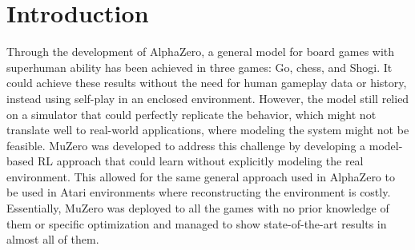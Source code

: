 \documentclass{article}
\begin{document}
\section*{Introduction}
Through the development of AlphaZero, a general model for board games with superhuman ability has 
been achieved in three games: Go, chess, and Shogi. It could achieve these results without the need for 
human gameplay data or history, instead using self-play in an enclosed environment. However, the 
model still relied on a simulator that could perfectly replicate the behavior, which might not translate 
well to real-world applications, where modeling the system might not be feasible. MuZero 
was developed to address this challenge by developing a model-based RL approach that could learn 
without explicitly modeling the real environment. This allowed for the same general approach used in 
AlphaZero to be used in Atari environments where reconstructing the environment is costly. Essentially, 
MuZero was deployed to all the games with no prior knowledge of them or specific optimization and 
managed to show state-of-the-art results in almost all of them.

\end{document}
